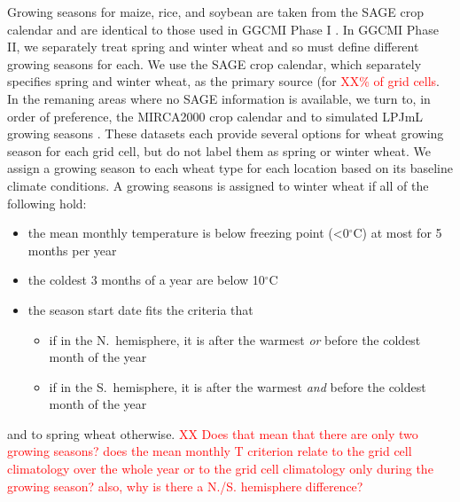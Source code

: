 \documentclass[gmd, manuscript]{copernicus} %
\begin{document}
{Growing seasons for maize, rice, and soybean are taken from the SAGE \textcolor{define acronym} crop calendar \citep{Sacks2010} and are identical to those used in GGCMI Phase I \citep{Elliott2015}.
In GGCMI Phase II, we separately treat spring and winter wheat and so must define different growing seasons for each.
We use the SAGE crop calendar, which separately specifies spring and winter wheat, as the primary source (for \textcolor{red}{XX\% of grid cells}. In the remaning areas where no SAGE information is available, we turn to, in order of preference, the MIRCA2000 crop calendar \citep{Portmann2010} and to simulated LPJmL growing seasons \citep{waha2012climate}.  These datasets each provide several options for wheat growing season for each grid cell, but do not label them as spring or winter wheat. We assign a growing season to each wheat type for each location based on its baseline climate conditions. 
A growing seasons is assigned to winter wheat if all of the following hold:
\begin{itemize}[noitemsep]
\item the mean monthly temperature is below freezing point (<0$^\circ$C) at most for 5 months per year
\item the coldest 3 months of a year are below 10$^\circ$C
\item the season start date fits the criteria that  
	\begin{itemize} 
		\item if in the N.\ hemisphere, it is after the warmest \textit{or} before the coldest month of the year 
		\item if in the S.\ hemisphere, it is after the warmest \textit{and} before the coldest month of the year
         \end{itemize}
\end{itemize}
and to spring wheat otherwise. 
\textcolor{red}{XX Does that mean that there are only two growing seasons? does the mean monthly T criterion relate to the grid cell climatology over the whole year or to the grid cell climatology only during the growing season? also, why is there a N./S. hemisphere difference?}


}
\end{document}
